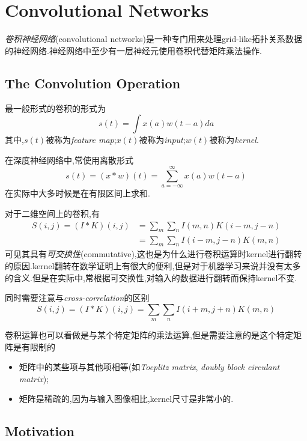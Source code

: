 \chapter{Convolutional Networks}

\textit{卷积神经网络}(convolutional networks)是一种专门用来处理grid-like拓扑关系数据的神经网络.神经网络中至少有一层神经元使用卷积代替矩阵乘法操作.

\section{The Convolution Operation}

最一般形式的卷积的形式为
\begin{equation}
s(t)=\int x(a)w(t-a)da
\end{equation}
其中,$s(t)$被称为\textit{feature map};$x(t)$被称为\textit{input};$w(t)$被称为\textit{kernel}.

在深度神经网络中,常使用离散形式
\begin{equation}
s(t)=(x*w)(t)=\sum_{a=-\infty}^\infty x(a)w(t-a)
\end{equation}
在实际中大多时候是在有限区间上求和.

对于二维空间上的卷积,有
\begin{equation}\begin{split}
S(i,j)=(I*K)(i,j)&=\sum_m\sum_nI(m,n)K(i-m,j-n) \\
&=\sum_m\sum_nI(i-m,j-n)K(m,n)
\end{split}\end{equation}
可见其具有\textit{可交换性}(commutative),这也是为什么进行卷积运算时kernel进行翻转的原因.kernel翻转在数学证明上有很大的便利,但是对于机器学习来说并没有太多的含义.但是在实际中,常根据可交换性,对输入的数据进行翻转而保持kernel不变.

同时需要注意与\textit{cross-correlation}的区别
\begin{equation}
S(i,j)=(I*K)(i,j)=\sum_m\sum_nI(i+m,j+n)K(m,n)
\end{equation}

卷积运算也可以看做是与某个特定矩阵的乘法运算,但是需要注意的是这个特定矩阵是有限制的
\begin{itemize}
    \item 矩阵中的某些项与其他项相等(如\textit{Toeplitz matrix}, \textit{doubly block circulant matrix});
    \item 矩阵是稀疏的,因为与输入图像相比,kernel尺寸是非常小的.
\end{itemize}

\section{Motivation}


